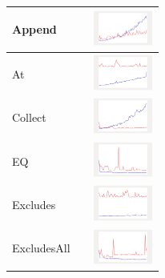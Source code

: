 \begin{longtable}{ m{2.5cm} m{8cm} m{2cm} }
  Append &
  
  & 
  	\includegraphics[width=2cm]{../graphs/orderedset/small/Append}
  \\\hline
  
  At &
  
  & 
  \includegraphics[width=2cm]{../graphs/orderedset/small/At}
\\\hline

Collect &

&
\includegraphics[width=2cm]{../graphs/orderedset/small/Collect}
\\\hline

EQ &

&
\includegraphics[width=2cm]{../graphs/orderedset/small/EQ}
\\\hline

Excludes &

&
\includegraphics[width=2cm]{../graphs/orderedset/small/Excludes}
\\\hline

ExcludesAll &

&
\includegraphics[width=2cm]{../graphs/orderedset/small/ExcludesAll}
\\\hline


\end{longtable}
